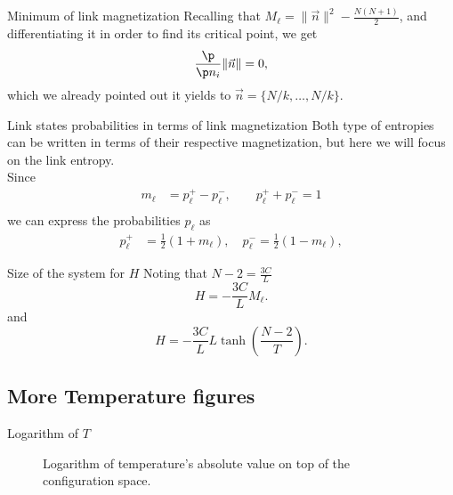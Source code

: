 \begin{frame}{Minimum of link magnetization}
Recalling that $M_\ell = \|\vec{n}\|^2  - \frac{N(N+1)}{2}$, and differentiating it in order to find its critical point, we get 
$$\frac{\p}{\p n_i} \|\vec{n}\| =0,$$
which we already pointed out it yields to $\vec{n} = \{N / k, \ldots, N / k \}$.
\end{frame}

\begin{frame}{Link states probabilities in terms of link magnetization}
Both type of  entropies can be written in terms of their respective magnetization, but here we will focus on the link entropy.\\[1em]

Since
\begin{align*}
	m_\ell &= p_{\ell}^{+} - p_{\ell}^{-},\qquad  p_{\ell}^{+} + p_{\ell}^{-} = 1\\
\end{align*}
we can express the probabilities $p_{\ell}$ as
\begin{align*}
    p_\ell^{+} &= \frac{1}{2}(1+m_\ell), \quad p_\ell^{-} = \frac{1}{2}(1-m_\ell),%
\end{align*}
\end{frame}

\begin{frame}{Size of the system for $H$}
	Noting that $N-2 = \frac{3C}{L}$
	\[
		H = -\frac{3C}{L}M_\ell.\label{eq:H_M}
	\]
	and
	\[
		H = -\frac{3C}{L}L\tanh \left(\frac{N-2}{T}\right). 
	\]
\end{frame}

\subsection{More Temperature figures}
\begin{frame}{Logarithm of $T$}
 \begin{figure}
    \centering
	\caption{Logarithm of temperature's absolute value on top of the configuration space.}
	\label{fig:Tlog}

 \end{figure}
\end{frame}

